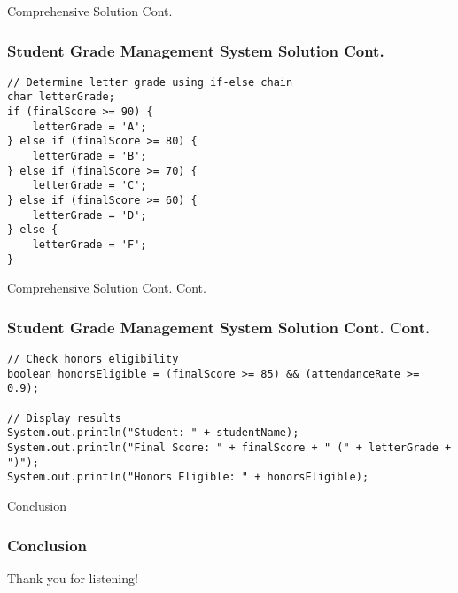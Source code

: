 \documentclass[aspectratio=169]{beamer}
\begin{document}
\begin{frame}[fragile]{Comprehensive Solution Cont.}
    \frametitle{Student Grade Management System Solution Cont.}
    \begin{lstlisting}
// Determine letter grade using if-else chain
char letterGrade;
if (finalScore >= 90) {
    letterGrade = 'A';
} else if (finalScore >= 80) {
    letterGrade = 'B';
} else if (finalScore >= 70) {
    letterGrade = 'C';
} else if (finalScore >= 60) {
    letterGrade = 'D';
} else {
    letterGrade = 'F';
}
    \end{lstlisting}
\end{frame}

\begin{frame}[fragile]{Comprehensive Solution Cont. Cont.}
    \frametitle{Student Grade Management System Solution Cont. Cont.}
    
    \begin{lstlisting}
// Check honors eligibility
boolean honorsEligible = (finalScore >= 85) && (attendanceRate >= 0.9);

// Display results
System.out.println("Student: " + studentName);
System.out.println("Final Score: " + finalScore + " (" + letterGrade + ")");
System.out.println("Honors Eligible: " + honorsEligible);

    \end{lstlisting}
\end{frame}


\begin{frame}{Conclusion}
    \frametitle{Conclusion}
    \begin{center}
        {\Large Thank you for listening!}
        
    \end{center}
\end{frame}
\end{document}
